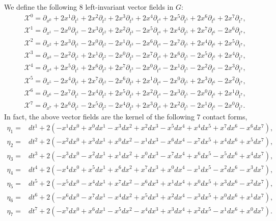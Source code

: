 \documentclass[10pt,a4paper]{amsart}
\numberwithin{equation}{section}
\begin{document}
We define the following $8$ left-invariant vector fields in $G$:
\small{\begin{align*}
&\mathscr{X}^0=\partial_{x^0}+2x^1 \partial_{t^1}+2x^2 \partial_{t^2}+2x^3 \partial_{t^3}+2x^4 \partial_{t^4}+2x^5 \partial_{t^5}+2x^6 \partial_{t^6}+2x^7 \partial_{t^7},\\
&\mathscr{X}^1 =\partial_{x^1}-2x^0 \partial_{t^1}-2x^3 \partial_{t^2}+2x^2 \partial_{t^3}-2x^5 \partial_{t^4}+2x^4 \partial_{t^5}+2x^7 \partial_{t^6}-2x^6  \partial_{t^7},\\
&\mathscr{X}^2=\partial_{x^2}+2x^3 \partial_{t^1}-2x^0 \partial_{t^2}-2x^1 \partial_{t^3}-2x^6\partial_{t^4}-2x^7\partial_{t^5}+2x^4\partial_{t^6}+2x^5 \partial_{t^7},\\
&\mathscr{X}^3=\partial_{x^3}-2x^2\partial_{t^1}+2x^1 \partial_{t^2}-2x^0 \partial_{t^3}-2x^7 \partial_{t^4}+2x^6 \partial_{t^5}-2x^5 \partial_{t^6}+2x^4 \partial_{t^7},\\
&\mathscr{X}^4=\partial_{x^4}+2x^5 \partial_{t^1}+2x^6 \partial_{t^2}+2x^7 \partial_{t^3}-2x^0\partial_{t^4}-2x^1 \partial_{t^5}-2x^2 \partial_{t^6}-2x^3\partial_{t^7},\\
&\mathscr{X}^5=\partial_{x^5}-2x^4 \partial_{t^1}+2x^7 \partial_{t^2}-2x^6 \partial_{t^3}+2x^1 \partial_{t^4}-2x^0\partial_{t^5}+2x^3\partial_{t^6}-2x^2 \partial_{t^7},\\
&\mathscr{X}^6=\partial_{x^6}-2x^7 \partial_{t^1}-2x^4\partial_{t^2}+2x^5\partial_{t^3}+2x^2 \partial_{t^4}-2x^3 \partial_{t^5}-2x^0\partial_{t^6}+2x^1 \partial_{t^7},\\
&\mathscr{X}^7=\partial_{x^7}+2x^6 \partial_{t^1}-2x^5 \partial_{t^2}-2x^4 \partial_{t^3}+2x^3 \partial_{t^4}+2x^2 \partial_{t^5}-2x^1 \partial_{t^6}-2x^0 \partial_{t^7}.   
 \end{align*}}
In fact, the above vector fields are the kernel of the following $7$ contact forms,
\small{\begin{align*}
    \eta_1=&dt^1+2(-x^1 dx^0+x^0 dx^1-x^3 dx^2+x^2 dx^3-x^5dx^4+x^4 dx^5+x^7 dx^6-x^6 dx^7),\\
    \eta_2=&dt^2+2(-x^2 dx^0+x^3 dx^1+x^0 dx^2-x^1dx^3-x^6 dx^4-x^7 dx^5+x^4 dx^6+x^5 dx^7),\\
    \eta_3=&dt^3+2(-x^3dx^0-x^2 dx^1+x^1dx^2+x^0 dx^3-x^7 dx^4+x^6dx^5-x^5 dx^6+x^4 dx^7),\\
    \eta_4=&dt^4+2(-x^4 dx^0+x^5dx^1+x^6 dx^2+x^7 dx^3+x^0 dx^4-x^1dx^5-x^2dx^6-x^3 dx^7),\\
    \eta_5=&dt^5+2(-x^5 dx^0-x^4dx^1+x^7 dx^2-x^6 dx^3+x^1 dx^4+x^0 dx^5+x^3 dx^6-x^2 dx^7),\\
    \eta_6=&dt^6+2(-x^6 dx^0-x^7 dx^1-x^4dx^2+x^5 dx^3+x^2dx^4-x^3 dx^5+x^0 dx^6+x^1 dx^7),\\
    \eta_7=&dt^7+2(-x^7 dx^0+x^6 dx^1-x^5 dx^2-x^4 dx^3+x^3 dx^4+x^2 dx^5-x^1 dx^6+x^0 dx^7).
    \end{align*}}
\end{document}
